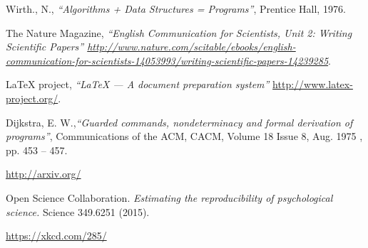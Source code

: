 \documentclass[11pt, oneside]{article}     %
\begin{document}
\begin{thebibliography}{99}



 Wirth., N., \emph{``Algorithms + Data Structures = Programs''},  Prentice Hall, 1976.

 The Nature Magazine, \emph{``English Communication for Scientists, Unit 2:  Writing Scientific Papers'' \url{http://www.nature.com/scitable/ebooks/english-communication-for-scientists-14053993/writing-scientific-papers-14239285}}.

 LaTeX project, \emph{``LaTeX --- A document preparation system''} \url{http://www.latex-project.org/}.

 Dijkstra, E. W.,\emph{``Guarded commands, nondeterminacy and formal derivation of programs''},  Communications of the ACM, CACM, Volume 18 Issue 8, Aug. 1975 , pp. 453 -- 457.

 \url{http://arxiv.org/}

 Open Science Collaboration. \emph{Estimating the reproducibility of psychological science.} Science 349.6251 (2015).

 \url{https://xkcd.com/285/}

\end{thebibliography}
\end{document}
